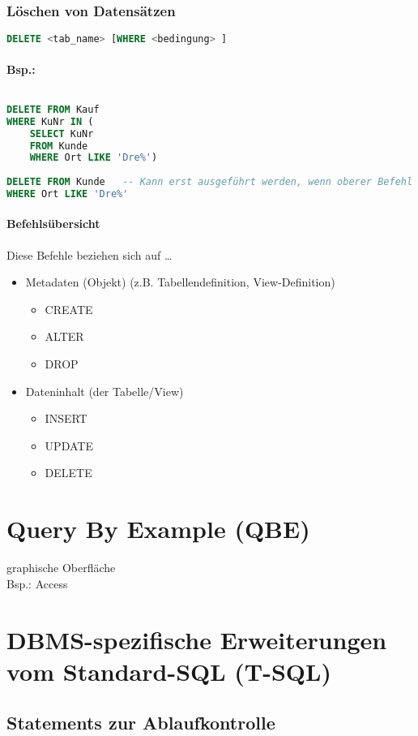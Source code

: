 \subsubsection{Löschen von Datensätzen}
\begin{lstlisting}[language=SQL]
DELETE <tab_name> [WHERE <bedingung> ]
\end{lstlisting}
\paragraph{Bsp.:} $ $
\begin{lstlisting}[language=SQL]
DELETE FROM Kauf
WHERE KuNr IN ( 
	SELECT KuNr
	FROM Kunde
	WHERE Ort LIKE 'Dre%')
	
DELETE FROM Kunde	-- Kann erst ausgeführt werden, wenn oberer Befehl ausgeführt werden. Wegen referenzieller Integrität!
WHERE Ort LIKE 'Dre%'
\end{lstlisting}
\paragraph{Befehlsübersicht} Diese Befehle beziehen sich auf …
\begin{itemize}
\item Metadaten (Objekt) (z.B. Tabellendefinition, View-Definition)
\begin{itemize}
\item CREATE
\item ALTER
\item DROP
\end{itemize}
\item Dateninhalt (der Tabelle/View)
\begin{itemize}
\item INSERT
\item UPDATE
\item DELETE
\end{itemize}
\end{itemize}

\section{Query By Example (QBE)}
graphische Oberfläche\\
Bsp.: Access

\section{DBMS-spezifische Erweiterungen vom Standard-SQL (T-SQL)}
\subsection{Statements zur Ablaufkontrolle}
